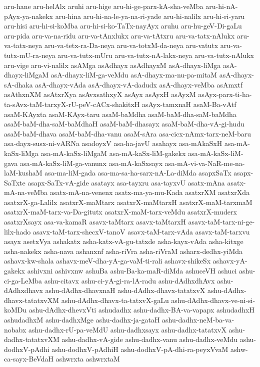 {aru-hane
aru-helAlx
aruhi
aru-hige
aru-hi-ge-parx-kA-sha-veMba
aru-hi-nA-pAyx-ya-nakekx
aru-hina
aru-hi-na-le-ya-na-ri-yade
aru-hi-nalilx
aru-hi-ri-yaru
aru-hisi
aru-hi-si-koMba
aru-hi-si-ko-TaTx-nayAyx
aruhu
aru-hu-geV-Di-gaLu
aru-pida
aru-va-na-ridu
aru-va-tAnxlukx
aru-va-tAtxru
aru-va-tatx-nAlukx
aru-va-tatx-neya
aru-va-tetx-ra-Da-neya
aru-va-totxM-da-neya
aru-vatutx
aru-va-tutx-mU-ra-neya
aru-va-tutx-mUru
aru-va-tutx-nA-lakx-neya
aru-va-tutx-nAlukx
aru-vige
aru-vi-nalilx
asAMga
asAdhayx
asAdhayxM
asA-dhayx-liMga
asA-dhayx-liMgaM
asA-dhayx-liM-ga-veMdu
asA-dhayx-ma-nu-pa-mitaM
asA-dhayx-sA-dhaka
asA-dhayx-vAda
asA-dhayx-vA-dadudx
asA-dhayx-veMba
asAmxtf
asAthxnXM
asAtxrXya
asAvxsathxyX
asAyx
asAyxH
asAyxM
asAyx-parx-ti-ha-ta-sAvx-taM-tarxyX-rU-peV-cACx-shakitxH
asAyx-tamxnaH
asaM-Ba-vAtf
asaM-KAyxta
asaM-KAyx-taru
asaM-baMdha
asaM-baM-dha-saM-baMdha
asaM-baM-dha-saM-baMdhaH
asaM-baM-dhasayx
asaM-baM-dha-vA-gi-hudu
asaM-baM-dhava
asaM-baM-dha-vanu
asaM-sAra
asa-cicx-nAmx-tarx-neM-baru
asa-dayx-susx-ni-vARNa
asadoyxV
asa-ha-javU
asahayx
asa-mAkaSxH
asa-mA-kaSx-liMga
asa-mA-kaSx-liMgaM
asa-mA-kaSx-liM-gakekx
asa-mA-kaSx-liM-gava
asa-mA-kaSx-liM-ga-vanunx
asa-mA-kaSxsayx
asa-mA-vi-va-NaR-me-na-laM-kushaM
asa-ma-liM-gada
asa-ma-sa-ha-sarx-nA-La-diMda
asapxSaTx
asapx-SaTxte
asapx-SaTx-vA-gide
asatayx
asa-tayxru
asa-tayxvU
asatx-mAna
asatx-mA-na-veMba
asatx-mA-na-venenx
asatx-ma-ya-mu-Kada
asatxrXM
asatxrXda
asatxrX-ga-Lalilx
asatxrX-maMtarx
asatxrX-maMtarxH
asatxrX-maM-tarxmaM
asatxrX-maM-tarx-va-Da-gitutx
asatxrX-maM-tarx-veMdu
asatxrX-muderx
asatxrXsayx
asa-va-kamaR
asavx-taMtarx
asavx-taMtarxH
asavx-taM-tarx-ni-ge-lilx-hado
asavx-taM-tarx-shecxV-tanoV
asavx-taM-tarx-vAda
asavx-taM-tarxvu
asayx
asetxVya
ashakatx
asha-katx-vA-gu-tatxde
asha-kayx-vAda
asha-kitxge
asha-nakekx
asha-nava
ashanxnf
asha-riVra
asha-riVraM
asharx-dedhx-yiMda
ashavx-kw-shala
ashavx-meV-dha-yA-ga-vaM-ti-rali
ashavx-shikeSx
ashavx-yA-gakekx
ashivxni
ashivxnw
ashuBa
ashu-Ba-ka-maR-diMda
ashuceVH
ashuci
ashu-ci-ga-LeMba
ashu-citavx
ashu-ci-yA-gi-ra-lA-radu
ashu-dAdhxdhAvx
ashu-dAdhxdhavx
ashu-dAdhx-dhavxnaH
ashu-dAdhx-dhavx-tatatxvX
ashu-dAdhx-dhavx-tatatxvXM
ashu-dAdhx-dhavx-ta-tatxvX-gaLu
ashu-dAdhx-dhavx-ve-ni-si-koMDu
ashu-dAdhx-dhevxVti
ashudadhx
ashu-dadhx-BA-va-vapapx
ashudadhxH
ashudadhxM
ashu-dadhxMge
ashu-dadhx-ja-gataH
ashu-dadhx-neM-ba-va-nobabx
ashu-dadhx-rU-pa-veMdU
ashu-dadhxsayx
ashu-dadhx-tatatxvX
ashu-dadhx-tatatxvXM
ashu-dadhx-vA-gide
ashu-dadhx-vanu
ashu-dadhx-veMdu
ashu-dodhxV-pAdhi
ashu-dodhxV-pAdhiH
ashu-dodhxV-pA-dhi-ra-peyxVvaM
ashw-ca-sayx-BeVdaH
ashwrxta
ashwrxtaM
}
